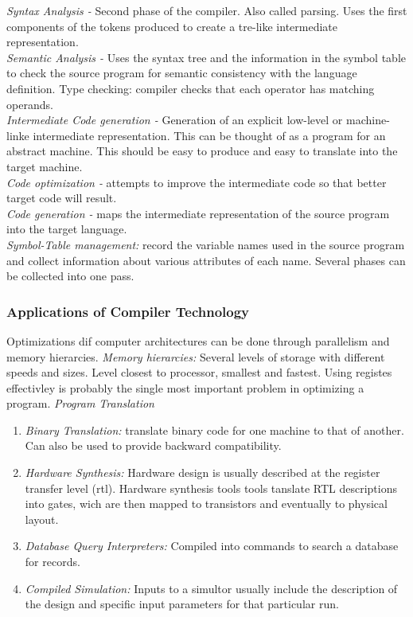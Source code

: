 \emph{Syntax Analysis - }
Second phase of the compiler. Also called parsing. Uses the first components of the tokens produced to create a tre-like intermediate representation. \\

\emph{Semantic Analysis - }
Uses the syntax tree and the information in the symbol table to check the source program for semantic consistency with the language definition. Type checking: compiler checks that each operator has matching operands. \\

\emph{Intermediate Code generation - } Generation of an explicit low-level or machine-linke intermediate representation. This can be thought of as a program for an abstract machine. This should be easy to produce and easy to translate into the target machine. \\

\emph{Code optimization - } attempts to improve the intermediate code so that better target code will result. \\

\emph{Code generation - } maps the intermediate representation of the source program into the target language. \\ 

\emph{Symbol-Table management:} record the variable names used in the source program and collect information about various attributes of each name. Several phases can be collected into one pass. \\ 

\subsubsection{Applications of Compiler Technology}
Optimizations dif computer architectures can be done through parallelism and memory hierarcies. \emph{Memory hierarcies: } Several levels of storage with different speeds and sizes. Level closest to processor, smallest and fastest. Using registes effectivley is probably the single most important problem in optimizing a program.
\emph{Program Translation}
\begin{enumerate}
	\item{\emph{Binary Translation:} translate binary code for one machine to that of another. Can also be used to provide backward compatibility.}
	\item{\emph{Hardware Synthesis:} Hardware design is usually described at the register transfer level (rtl). Hardware synthesis tools tools tanslate RTL descriptions into gates, wich are then mapped to transistors and eventually to physical layout.}
	\item{\emph{Database Query Interpreters:} Compiled into commands to search a database for records. }
	\item{\emph{Compiled Simulation:} Inputs to a simultor usually include the description of the design and specific input parameters for that particular run. }
\end{enumerate}

